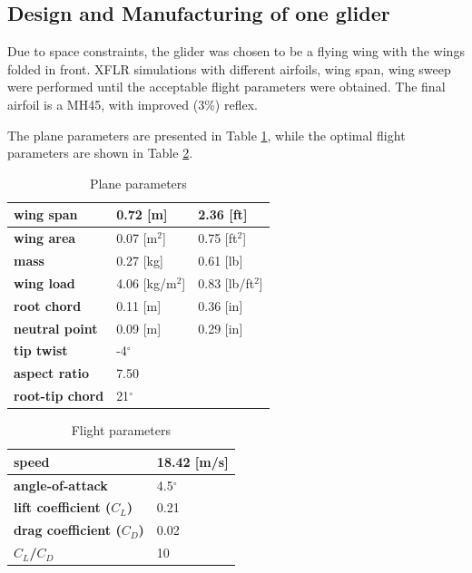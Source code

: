 \subsection{Design and Manufacturing of one glider}

Due to space constraints, the glider was chosen to be a flying wing with the wings folded in front. XFLR simulations with different airfoils, wing span, wing sweep were performed until the acceptable flight parameters were obtained. The final airfoil is a MH45, with improved (3\%) reflex.

The plane parameters are presented in Table \ref{plane_param}, while the optimal flight parameters are shown in Table \ref{flight_param}.


\begin{table}[h!]
\centering
\begin{tabular}{|l|l|l|}
\hline
\textbf{wing span}      & 0.72 {[}m{]}        & 2.36 {[}ft{]}        \\ \hline
\textbf{wing area}      & 0.07 {[}m$^2${]}    & 0.75 {[}ft$^2${]}   \\ \hline
\textbf{mass}           & 0.27 {[}kg{]}       & 0.61 {[}lb{]}        \\ \hline
\textbf{wing load}      & 4.06 {[}kg/m$^2${]} & 0.83 {[}lb/ft$^2${]} \\ \hline
\textbf{root chord}     & 0.11 {[}m{]}        & 0.36 {[}in{]}        \\ \hline
\textbf{neutral point}  & 0.09 {[}m{]}        & 0.29 {[}in{]}        \\ \hline
\textbf{tip twist}      & -4$^\circ$        &                      \\ \hline
\textbf{aspect ratio}   & 7.50                &                      \\ \hline
\textbf{root-tip chord} & 21$^\circ$        &                      \\ \hline
\end{tabular}
\caption{Plane parameters}
\label{plane_param}
\end{table}



\begin{table}[h!]
\centering
\begin{tabular}{|l|l|}
\hline
\textbf{speed}                    & 18.42 {[}m/s{]} \\ \hline
\textbf{angle-of-attack}          & 4.5$^\circ$                        \\ \hline
\textbf{lift coefficient ($C_L$)} & 0.21                               \\ \hline
\textbf{drag coefficient ($C_D$)} & 0.02                               \\ \hline
\textbf{$C_L$/$C_D$}              & 10                                 \\ \hline
\end{tabular}
\caption{Flight parameters}
\label{flight_param}
\end{table}


